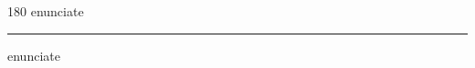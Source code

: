 
\begin{frame}
\begin{center}
\begin{turn}{180}
{\fontsize{2.5cm}{1em}\selectfont enunciate}
\end{turn}
\vspace{1em}\par  
\hrule
\vspace{1em}\par  
{\fontsize{2.5cm}{1em}\selectfont enunciate}
\end{center}
\end{frame}
